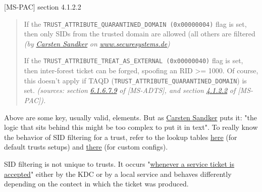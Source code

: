 [MS-PAC] section 4.1.2.2


\begin{quote}

If the \verb|TRUST_ATTRIBUTE_QUARANTINED_DOMAIN (0x00000004)| flag is set, then only SIDs from the trusted domain are allowed (all others are filtered
\textit{(by} \href{https://twitter.com/0xcsandker}{\textit{Carsten Sandker}} \textit{on} \href{https://www.securesystems.de/blog/active-directory-spotlight-trusts-part-2-operational-guidance/}{\textit{www.securesystems.de}}\textit{)}

If the \verb|TRUST_ATTRIBUTE_TREAT_AS_EXTERNAL (0x00000040)| flag is set, then inter-forest ticket can be forged, spoofing an RID >= 1000. Of course, this doesn't apply if TAQD (\verb|TRUST_ATTRIBUTE_QUARANTINED_DOMAIN|) is set.
\textit{(sources: section} \href{https://learn.microsoft.com/en-us/openspecs/windows_protocols/ms-adts/e9a2d23c-c31e-4a6f-88a0-6646fdb51a3c?redirectedfrom=MSDN}{\textit{6.1.6.7.9}} \textit{of [MS-ADTS], and section} \href{https://learn.microsoft.com/en-us/openspecs/windows_protocols/ms-pac/55fc19f2-55ba-4251-8a6a-103dd7c66280}{\textit{4.1.2.2}} \textit{of [MS-PAC]).}

\end{quote}

Above are some key, usually valid, elements. But as \href{https://twitter.com/0xcsandker}{Carsten Sandker} puts it: "the logic that sits behind this might be too complex to put it in text". To really know the behavior of SID filtering for a trust, refer to the lookup tables \href{https://www.securesystems.de/images/blog/active-directory-spotlight-trusts-part-2-operational-guidance/OC-b4We5WFiXhTirzI_Dyw.png}{here} (for default trusts setups) and \href{https://www.securesystems.de/images/blog/active-directory-spotlight-trusts-part-2-operational-guidance/99icUS7SKCscWq6VzW0o5g.png}{there} (for custom configs).

SID filtering is not unique to trusts. It occurs "\href{https://twitter.com/SteveSyfuhs/status/1329148611305693185}{whenever a service ticket is accepted}" either by the KDC or by a local service and behaves differently depending on the contect in which the ticket was produced.

